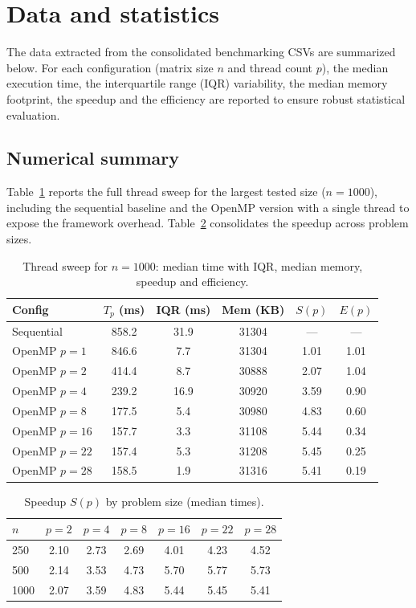 \documentclass[12pt,a4paper]{article}
\begin{document}
\section{Data and statistics}
\label{sec:data}

The data extracted from the consolidated benchmarking CSVs are summarized
below. For each configuration (matrix size $n$ and thread count $p$), the
median execution time, the interquartile range (IQR) variability, the median
memory footprint, the speedup and the efficiency are reported to ensure
robust statistical evaluation.

\subsection{Numerical summary}
\label{sec:numsummary}

Table~\ref{tab:sweep} reports the full thread sweep for the largest tested
size ($n = 1000$), including the sequential baseline and the OpenMP version
with a single thread to expose the framework overhead.
Table~\ref{tab:cross} consolidates the speedup across problem sizes.

\begin{table}[h]
\centering
\caption{Thread sweep for $n = 1000$: median time with IQR, median memory,
speedup and efficiency.}
\label{tab:sweep}
\begin{tabular}{@{}lccccc@{}}
\toprule
Config & $T_p$ (ms) & IQR (ms) & Mem (KB) & $S(p)$ & $E(p)$ \\
\midrule
Sequential & 858.2 & 31.9 & 31304 & --- & --- \\
OpenMP $p=1$ & 846.6 & 7.7 & 31304 & 1.01 & 1.01 \\
OpenMP $p=2$ & 414.4 & 8.7 & 30888 & 2.07 & 1.04 \\
OpenMP $p=4$ & 239.2 & 16.9 & 30920 & 3.59 & 0.90 \\
OpenMP $p=8$ & 177.5 & 5.4 & 30980 & 4.83 & 0.60 \\
OpenMP $p=16$ & 157.7 & 3.3 & 31108 & 5.44 & 0.34 \\
OpenMP $p=22$ & 157.4 & 5.3 & 31208 & 5.45 & 0.25 \\
OpenMP $p=28$ & 158.5 & 1.9 & 31316 & 5.41 & 0.19 \\
\bottomrule
\end{tabular}
\end{table}

\begin{table}[h]
\centering
\caption{Speedup $S(p)$ by problem size (median times).}
\label{tab:cross}
\begin{tabular}{@{}lcccccc@{}}
\toprule
$n$ & $p=2$ & $p=4$ & $p=8$ & $p=16$ & $p=22$ & $p=28$ \\
\midrule
250 & 2.10 & 2.73 & 2.69 & 4.01 & 4.23 & 4.52 \\
500 & 2.14 & 3.53 & 4.73 & 5.70 & 5.77 & 5.73 \\
1000 & 2.07 & 3.59 & 4.83 & 5.44 & 5.45 & 5.41 \\
\bottomrule
\end{tabular}
\end{table}
\end{document}
